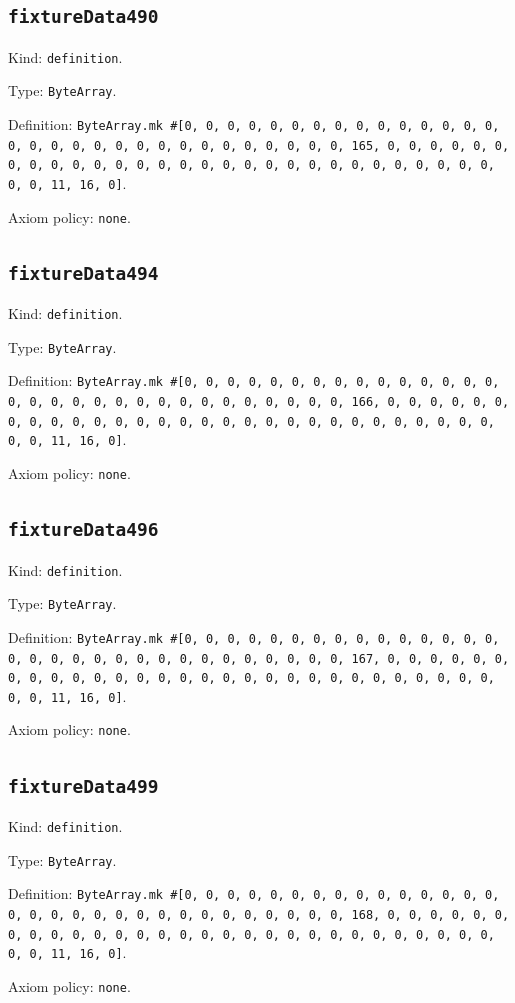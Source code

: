 \documentclass[11pt]{article}
\begin{document}
\subsection*{\texttt{fixtureData490}}
\noindent Kind: \texttt{definition}.\par
\noindent Type: \texttt{ByteArray}.\par
\noindent Definition: \texttt{ByteArray.mk \#[0, 0, 0, 0, 0, 0, 0, 0, 0, 0, 0, 0, 0, 0, 0, 0, 0, 0, 0, 0, 0, 0, 0, 0, 0, 0, 0, 0, 0, 0, 0, 165, 0, 0, 0, 0, 0, 0, 0, 0, 0, 0, 0, 0, 0, 0, 0, 0, 0, 0, 0, 0, 0, 0, 0, 0, 0, 0, 0, 0, 0, 0, 0, 11, 16, 0]}.\par
\noindent Axiom policy: \texttt{none}.\par
\subsection*{\texttt{fixtureData494}}
\noindent Kind: \texttt{definition}.\par
\noindent Type: \texttt{ByteArray}.\par
\noindent Definition: \texttt{ByteArray.mk \#[0, 0, 0, 0, 0, 0, 0, 0, 0, 0, 0, 0, 0, 0, 0, 0, 0, 0, 0, 0, 0, 0, 0, 0, 0, 0, 0, 0, 0, 0, 0, 166, 0, 0, 0, 0, 0, 0, 0, 0, 0, 0, 0, 0, 0, 0, 0, 0, 0, 0, 0, 0, 0, 0, 0, 0, 0, 0, 0, 0, 0, 0, 0, 11, 16, 0]}.\par
\noindent Axiom policy: \texttt{none}.\par
\subsection*{\texttt{fixtureData496}}
\noindent Kind: \texttt{definition}.\par
\noindent Type: \texttt{ByteArray}.\par
\noindent Definition: \texttt{ByteArray.mk \#[0, 0, 0, 0, 0, 0, 0, 0, 0, 0, 0, 0, 0, 0, 0, 0, 0, 0, 0, 0, 0, 0, 0, 0, 0, 0, 0, 0, 0, 0, 0, 167, 0, 0, 0, 0, 0, 0, 0, 0, 0, 0, 0, 0, 0, 0, 0, 0, 0, 0, 0, 0, 0, 0, 0, 0, 0, 0, 0, 0, 0, 0, 0, 11, 16, 0]}.\par
\noindent Axiom policy: \texttt{none}.\par
\subsection*{\texttt{fixtureData499}}
\noindent Kind: \texttt{definition}.\par
\noindent Type: \texttt{ByteArray}.\par
\noindent Definition: \texttt{ByteArray.mk \#[0, 0, 0, 0, 0, 0, 0, 0, 0, 0, 0, 0, 0, 0, 0, 0, 0, 0, 0, 0, 0, 0, 0, 0, 0, 0, 0, 0, 0, 0, 0, 168, 0, 0, 0, 0, 0, 0, 0, 0, 0, 0, 0, 0, 0, 0, 0, 0, 0, 0, 0, 0, 0, 0, 0, 0, 0, 0, 0, 0, 0, 0, 0, 11, 16, 0]}.\par
\noindent Axiom policy: \texttt{none}.\par
\end{document}
